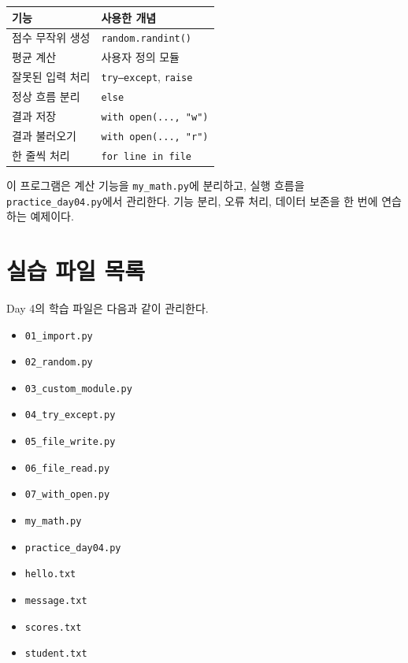 \documentclass[11pt,a4paper]{article}
\begin{document}
\begin{center}
\begin{tabular}{ll}
\toprule
기능 & 사용한 개념 \\
\midrule
점수 무작위 생성 & \texttt{random.randint()} \\
평균 계산 & 사용자 정의 모듈 \\
잘못된 입력 처리 & \texttt{try--except}, \texttt{raise} \\
정상 흐름 분리 & \texttt{else} \\
결과 저장 & \texttt{with open(..., "w")} \\
결과 불러오기 & \texttt{with open(..., "r")} \\
한 줄씩 처리 & \texttt{for line in file} \\
\bottomrule
\end{tabular}
\end{center}

\begin{importantbox}
이 프로그램은 계산 기능을 \texttt{my\_math.py}에 분리하고, 실행 흐름을 \texttt{practice\_day04.py}에서 관리한다. 기능 분리, 오류 처리, 데이터 보존을 한 번에 연습하는 예제이다.
\end{importantbox}

\section{실습 파일 목록}

\begin{practicebox}
Day 4의 학습 파일은 다음과 같이 관리한다.
\begin{itemize}[leftmargin=1.5em]
    \item \texttt{01\_import.py}
    \item \texttt{02\_random.py}
    \item \texttt{03\_custom\_module.py}
    \item \texttt{04\_try\_except.py}
    \item \texttt{05\_file\_write.py}
    \item \texttt{06\_file\_read.py}
    \item \texttt{07\_with\_open.py}
    \item \texttt{my\_math.py}
    \item \texttt{practice\_day04.py}
    \item \texttt{hello.txt}
    \item \texttt{message.txt}
    \item \texttt{scores.txt}
    \item \texttt{student.txt}
\end{itemize}
\end{practicebox}
\end{document}

